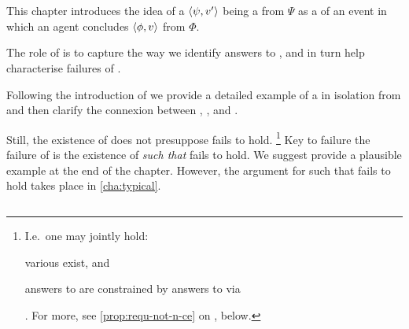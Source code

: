 \chapter{}
\label{cha:requs}

\begin{note}
  This chapter introduces the idea of a \(\langle\psi, v'\rangle\) being a \fc{} from \(\Psi\) as a  of an event in which an agent concludes \(\langle\phi, v\rangle\) from \(\Phi\).

  The role of  is to capture the way we identify answers to \qWhy{}, and in turn help characterise failures of \issueInclusion{}.

  Following the introduction of  we provide a detailed example of a  in isolation from \issueInclusion{} and then clarify the connexion between , \qWhy{}, and \issueInclusion{}.

  Still, the existence of  does not presuppose \issueInclusion{} fails to hold.%
  \footnote{
    I.e.\ one may jointly hold:
    \begin{enumerate*}[label=(\alph*)]
    \item
      various  exist, and
    \item
      answers to \qWhy{} are constrained by answers to \qHow{} via \issueInclusion{}
    \end{enumerate*}%
    .
    For more, see \autoref{prop:requ-not-n-ce} on , below.
  }
  Key to failure the failure of \issueInclusion{} is the existence of  \emph{such that} \issueInclusion{} fails to hold.
  We suggest provide a plausible example at the end of the chapter.
  However, the argument for  such that \issueInclusion{} fails to hold takes place in \autoref{cha:typical}.
\end{note}



\section{}
\label{cha:requs:requs}

